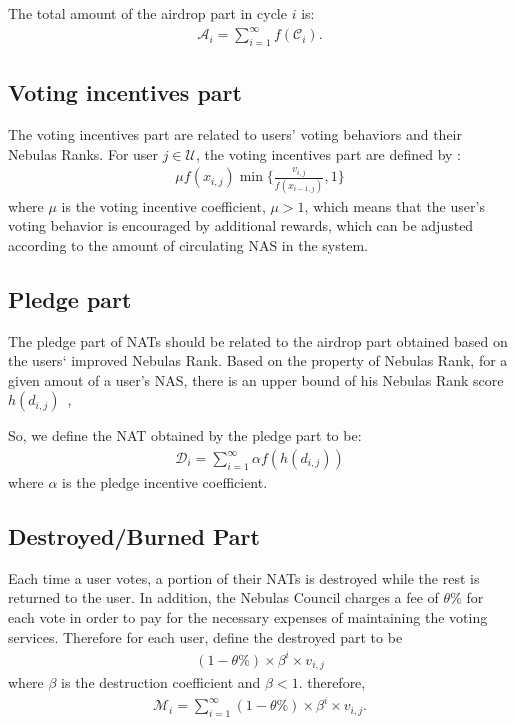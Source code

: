 The total amount of the airdrop part  in cycle $i$ is:
\begin{align}
\mathcal{A}_i = \sum_{i=1}^{\infty}f(\mathcal{C}_i).
\end{align}

\subsection{Voting incentives part}
The voting incentives part are related to users' voting behaviors and their Nebulas Ranks. For user $j \in \mathcal{U}$, the voting incentives part are defined by :
\begin{align}
\mu f(x_{i,j}) \min\{\frac{v_{i,j}}{f(x_{i-1,j})},1\}
\end{align}
\noindent where $\mu$ is the voting incentive coefficient, $\mu > 1$, which means that the user's voting behavior is encouraged by additional rewards, which can be adjusted according to the amount of circulating NAS in the system.

\subsection{Pledge part}
The pledge part of NATs should be related to the airdrop part obtained based on the users‘ improved Nebulas Rank. Based on the property of Nebulas Rank, for a given amout of a user's NAS, there is an upper bound of his Nebulas Rank score $h(d_{i,j})$~\cite{ImproveNR},

So, we define the NAT obtained by the pledge part to be:
\begin{align}
\mathcal{D}_i = \sum_{i=1}^{\infty}\alpha f(h(d_{i,j}))
\end{align}
\noindent where $\alpha$ is the pledge incentive coefficient.


\subsection{Destroyed/Burned Part}
\label{burn}
Each time a user votes, a portion of their NATs is destroyed while the rest is returned to the user. In addition, the Nebulas Council charges a fee of $\theta\%$ for each vote in order to pay for the necessary expenses of maintaining the voting services. Therefore for each user, define the destroyed part to be
\begin{align}
(1-\theta\%) \times \beta^i \times v_{i,j}
\end{align}
\noindent where $\beta$ is the destruction coefficient and $\beta < 1$. therefore,
\begin{align}
    \mathcal{M}_i = \sum_{i=1}^{\infty} (1-\theta\%) \times \beta^i \times v_{i,j} .
\end{align}

